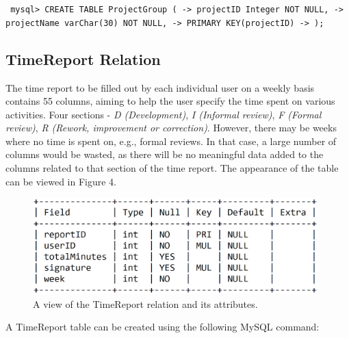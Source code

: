 \documentclass{article}
\begin{document}
\small
\texttt{
\noindent mysql> CREATE TABLE ProjectGroup (\newline
\indent\indent\indent -> projectID Integer NOT NULL,\newline
\indent\indent\indent -> projectName varChar(30) NOT NULL,\newline
\indent\indent\indent -> PRIMARY KEY(projectID)\newline
\indent\indent\indent -> );
}
\normalsize

\subsection{TimeReport Relation}
The time report to be filled out by each individual user on a weekly basis contains 55 columns, aiming to help the user specify the time spent on various activities. Four sections - \emph{D (Development)}, \emph{I (Informal review)}, \emph{F (Formal review)}, \emph{R (Rework, improvement or correction)}. However, there may be weeks where no time is spent on, e.g.,  formal reviews. In that case, a large number of columns would be wasted, as there will be no meaningful data added to the columns related to that section of the time report.  The appearance of the table can be viewed in Figure 4.

\begin{figure}[H]
     \centering
     \includegraphics[width=11cm]{images/SQL_tables/timereport.png}
     \renewcommand\figurename{Figure}
     \caption{A view of the TimeReport relation and its attributes.}
     \label{fig:my_label}
 \end{figure}
\newline

A TimeReport table can be created using the following MySQL command:
\newline
\end{document}
